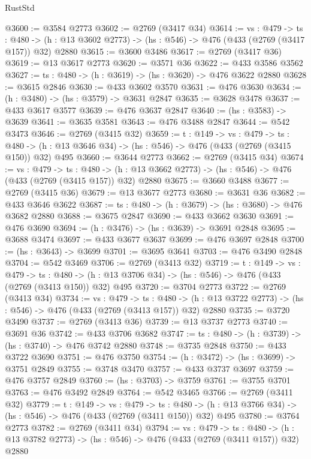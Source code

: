 \begin{lexlean}{RustStd}
\begin{coremodule}
@3600 := @3584 @2773
@3602 := @2769 (@3417 @34)
@3614 := {vs : @479} ->
  {ts : @480} -> (h : @13 @3602 @2773) -> (hs : @546) -> @476 (@433 (@2769 (@3417 @157)) @32) @2880
@3615 := @3600 @3486
@3617 := @2769 (@3417 @36)
@3619 := @13 @3617 @2773
@3620 := @3571 @36
@3622 := @433 @3586 @3562
@3627 := {ts : @480} -> (h : @3619) -> (hs : @3620) -> @476 @3622 @2880
@3628 := @3615 @2846
@3630 := @433 @3602 @3570
@3631 := @476 @3630
@3634 := (h : @3480) -> (hs : @3579) -> @3631 @2847
@3635 := @3628 @3478
@3637 := @433 @3617 @3577
@3639 := @476 @3637 @2847
@3640 := (hs : @3583) -> @3639
@3641 := @3635 @3581
@3643 := @476 @3488 @2847
@3644 := @542 @3473
@3646 := @2769 (@3415 @32)
@3659 := {t : @149} ->
  {vs : @479} ->
  {ts : @480} -> (h : @13 @3646 @34) -> (hs : @546) -> @476 (@433 (@2769 (@3415 @150)) @32) @495
@3660 := @3644 @2773
@3662 := @2769 (@3415 @34)
@3674 := {vs : @479} ->
  {ts : @480} -> (h : @13 @3662 @2773) -> (hs : @546) -> @476 (@433 (@2769 (@3415 @157)) @32) @2880
@3675 := @3660 @3488
@3677 := @2769 (@3415 @36)
@3679 := @13 @3677 @2773
@3680 := @3631 @36
@3682 := @433 @3646 @3622
@3687 := {ts : @480} -> (h : @3679) -> (hs : @3680) -> @476 @3682 @2880
@3688 := @3675 @2847
@3690 := @433 @3662 @3630
@3691 := @476 @3690
@3694 := (h : @3476) -> (hs : @3639) -> @3691 @2848
@3695 := @3688 @3474
@3697 := @433 @3677 @3637
@3699 := @476 @3697 @2848
@3700 := (hs : @3643) -> @3699
@3701 := @3695 @3641
@3703 := @476 @3490 @2848
@3704 := @542 @3469
@3706 := @2769 (@3413 @32)
@3719 := {t : @149} ->
  {vs : @479} ->
  {ts : @480} -> (h : @13 @3706 @34) -> (hs : @546) -> @476 (@433 (@2769 (@3413 @150)) @32) @495
@3720 := @3704 @2773
@3722 := @2769 (@3413 @34)
@3734 := {vs : @479} ->
  {ts : @480} -> (h : @13 @3722 @2773) -> (hs : @546) -> @476 (@433 (@2769 (@3413 @157)) @32) @2880
@3735 := @3720 @3490
@3737 := @2769 (@3413 @36)
@3739 := @13 @3737 @2773
@3740 := @3691 @36
@3742 := @433 @3706 @3682
@3747 := {ts : @480} -> (h : @3739) -> (hs : @3740) -> @476 @3742 @2880
@3748 := @3735 @2848
@3750 := @433 @3722 @3690
@3751 := @476 @3750
@3754 := (h : @3472) -> (hs : @3699) -> @3751 @2849
@3755 := @3748 @3470
@3757 := @433 @3737 @3697
@3759 := @476 @3757 @2849
@3760 := (hs : @3703) -> @3759
@3761 := @3755 @3701
@3763 := @476 @3492 @2849
@3764 := @542 @3465
@3766 := @2769 (@3411 @32)
@3779 := {t : @149} ->
  {vs : @479} ->
  {ts : @480} -> (h : @13 @3766 @34) -> (hs : @546) -> @476 (@433 (@2769 (@3411 @150)) @32) @495
@3780 := @3764 @2773
@3782 := @2769 (@3411 @34)
@3794 := {vs : @479} ->
  {ts : @480} -> (h : @13 @3782 @2773) -> (hs : @546) -> @476 (@433 (@2769 (@3411 @157)) @32) @2880

\end{coremodule}
\end{lexlean}
